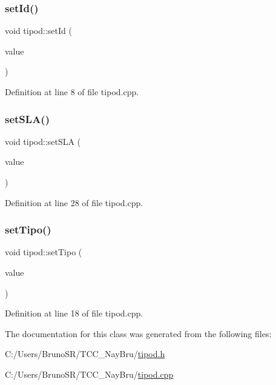 \hypertarget{classtipod_ae3f6b8df170353ef58a862b746d3d288}{}\label{classtipod_ae3f6b8df170353ef58a862b746d3d288} 
\subsubsection{\texorpdfstring{set\+Id()}{setId()}}
{\footnotesize\ttfamily void tipod\+::set\+Id (\begin{DoxyParamCaption}\item[{int}]{value }\end{DoxyParamCaption})}



Definition at line 8 of file tipod.\+cpp.

\hypertarget{classtipod_ad0da4edb16cb79061875519e94b768d7}{}\label{classtipod_ad0da4edb16cb79061875519e94b768d7} 
\subsubsection{\texorpdfstring{set\+S\+L\+A()}{setSLA()}}
{\footnotesize\ttfamily void tipod\+::set\+S\+LA (\begin{DoxyParamCaption}\item[{float}]{value }\end{DoxyParamCaption})}



Definition at line 28 of file tipod.\+cpp.

\hypertarget{classtipod_a2430c9b9e742243038b3fdb43a7bd429}{}\label{classtipod_a2430c9b9e742243038b3fdb43a7bd429} 
\subsubsection{\texorpdfstring{set\+Tipo()}{setTipo()}}
{\footnotesize\ttfamily void tipod\+::set\+Tipo (\begin{DoxyParamCaption}\item[{const Q\+String \&}]{value }\end{DoxyParamCaption})}



Definition at line 18 of file tipod.\+cpp.



The documentation for this class was generated from the following files\+:\begin{DoxyCompactItemize}
\item 
C\+:/\+Users/\+Bruno\+S\+R/\+T\+C\+C\+\_\+\+Nay\+Bru/\hyperlink{tipod_8h}{tipod.\+h}\item 
C\+:/\+Users/\+Bruno\+S\+R/\+T\+C\+C\+\_\+\+Nay\+Bru/\hyperlink{tipod_8cpp}{tipod.\+cpp}\end{DoxyCompactItemize}
